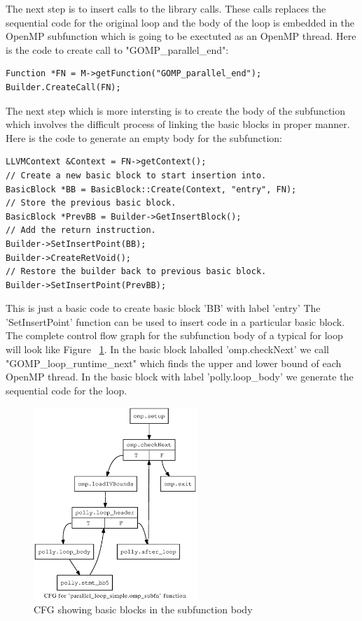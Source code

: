 The next step is to insert calls to the library calls. These calls replaces the sequential code for
the original loop and the body of the loop is embedded in the OpenMP subfunction which is
going to be exectuted as an OpenMP thread. Here is the code to create call to "GOMP\_parallel\_end":
{\footnotesize
\begin{lstlisting}
Function *FN = M->getFunction("GOMP_parallel_end");
Builder.CreateCall(FN);
\end{lstlisting}
}

The next step which is more intersting is to create the body of the subfunction which involves the difficult process of
linking the basic blocks in proper manner. Here is the code to generate an empty body for the subfunction:
{\footnotesize
\begin{lstlisting}
LLVMContext &Context = FN->getContext();
// Create a new basic block to start insertion into.
BasicBlock *BB = BasicBlock::Create(Context, "entry", FN);
// Store the previous basic block.
BasicBlock *PrevBB = Builder->GetInsertBlock();
// Add the return instruction.
Builder->SetInsertPoint(BB);
Builder->CreateRetVoid();
// Restore the builder back to previous basic block.
Builder->SetInsertPoint(PrevBB);
\end{lstlisting}
}
This is just a basic code to create basic block 'BB' with label 'entry' The 'SetInsertPoint' function
can be used to insert code in a particular basic block. The complete control flow graph for the
subfunction body of a typical for loop will look like Figure ~\ref{fig:subfunction_cfg}. In the basic
block laballed 'omp.checkNext' we call "GOMP\_loop\_runtime\_next" which finds the upper and 
lower bound of each OpenMP thread. In the basic block with label 'polly.loop\_body' we
generate the sequential code for the loop.

\begin{figure}
\begin{center}
  \includegraphics[width=0.55\textwidth]{images/cfg2.ps}
  \caption{CFG showing basic blocks in the subfunction body}
  \label{fig:subfunction_cfg}
\end{center}
\end{figure}

